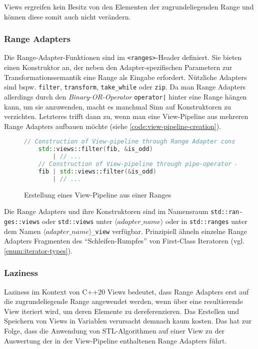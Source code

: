 \documentclass[runningheads]{llncs}
\begin{document}
Views ergreifen kein Besitz von den Elementen der zugrundeliegenden Range und können diese somit auch nicht verändern.

\subsubsection{Range Adapters}

Die Range-Adapter-Funktionen sind im \texttt{<ranges>}-Header definiert.
Sie bieten einen Konstruktor an, der neben den Adapter-spezifischen Parametern zur Transformationssemantik eine Range als Eingabe erfordert.
Nützliche Adapters sind bspw. \texttt{filter}, \texttt{transform}, \texttt{take\_while} oder \texttt{zip}.
Da man Range Adapters allerdings durch den \textit{Binary-OR-Operator} \texttt{operator|} hinter eine Range hängen kann, um sie anzuwenden, macht es manchmal Sinn auf Konstruktoren zu verzichten.
Letzteres trifft dann zu, wenn man eine View-Pipeline aus mehreren Range Adapters aufbauen möchte (siehe \autoref{code:view-pipeline-creation}).

\begin{figure}[H]
	\caption{Erstellung eines View-Pipeline aus einer Ranges}
	\label{code:view-pipeline-creation}
	\begin{lstlisting}[language=C++]
	// Construction of View-pipeline through Range Adapter constructor
	std::views::filter(fib, &is_odd)
		| // ...
	// Construction of View-pipeline through pipe-operator chaining
	fib | std::views::filter(&is_odd)
		| // ...
	\end{lstlisting}
\end{figure}

\noindent Die Range Adapters und ihre Konstruktoren sind im Namensraum \texttt{std::ran-ges::views} oder \texttt{std::views} unter \texttt{$\langle adapter\_name\rangle$} oder in \texttt{std::ranges} unter dem Namen \texttt{$\langle adapter\_name\rangle$\_view} verfügbar.
Prinzipiell ähneln einzelne Range Adapters Fragmenten des \enquote{Schleifen-Rumpfes} von First-Class Iteratoren (vgl. \ref{enum:iterator-types}).

\subsubsection{Laziness}

Laziness im Kontext von C++20 Views bedeutet, dass Range Adapters erst auf die zugrundeliegende Range angewendet werden, wenn über eine resultierende View iteriert wird, um deren Elemente zu dereferenzieren.
Das Erstellen und Speichern von Views in Variablen verursacht demnach kaum kosten.
Das hat zur Folge, dass die Anwendung von STL-Algorithmen auf einer View zu der Auswertung der in der View-Pipeline enthaltenen Range Adapters führt.
\end{document}
